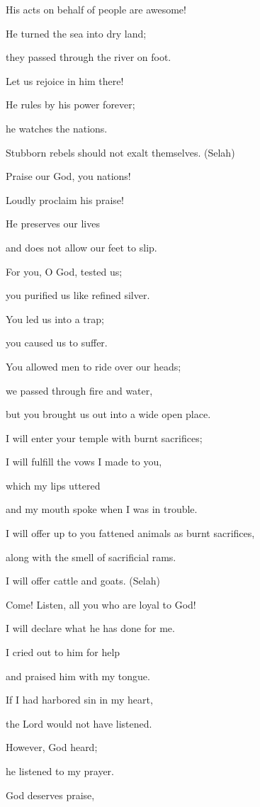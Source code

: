{\par }{\Q His acts
on
behalf of people
are awesome!
\par }{\Q {}He turned
the sea
into dry land;
\par }{\Q they passed
through the river
on foot.
\par }{\Q Let us rejoice
in him there!
\par }{\Q {}He rules
by his power
forever;
\par }{\Q he watches
the nations.
\par }{\Q Stubborn
rebels
should not
exalt
themselves. (Selah)
\par }{\Q {}Praise
our God,
you nations!
\par }{\Q Loudly
proclaim
his praise!
\par }{\Q {}He preserves
our lives
\par }{\Q and does not
allow
our feet
to slip.
\par }{\Q {}For
you, O God,
tested
us;
\par }{\Q you purified
us like refined
silver.
\par }{\Q {}You led
us into a trap;
\par }{\Q you caused
us to suffer.
\par }{\Q {}You allowed men
to ride over
our heads;
\par }{\Q we passed through
fire
and water,
\par }{\Q but you brought
us out
into a wide open place.
\par }{\Q {}I will enter
your temple
with burnt sacrifices;
\par }{\Q I will fulfill
the vows I made to you,
\par }{\Q {}which
my lips
uttered
\par }{\Q and my mouth
spoke
when I was in trouble.
\par }{\Q {}I will offer up to you fattened
animals as burnt sacrifices,
\par }{\Q along with
the smell
of sacrificial rams.
\par }{\Q I will offer
cattle
and goats.
(Selah)
\par }{\Q {}Come! Listen,
all
you who are loyal
to God!

\par }{\Q I will declare
what
he has done
for me.
\par }{\Q {}I cried out
to
him for help

\par }{\Q and praised
him with
my tongue.
\par }{\Q {}If
I had harbored sin
in my heart,
\par }{\Q the Lord
would not
have listened.
\par }{\Q {}However,
God
heard;
\par }{\Q he listened
to my prayer.
\par }{\Q {}God
deserves
praise,

}
